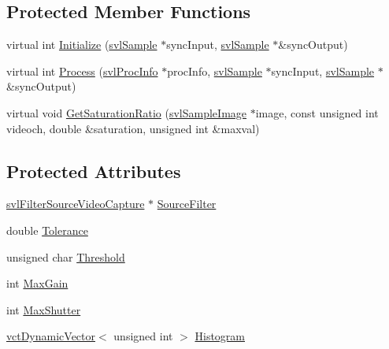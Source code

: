 \subsection*{Protected Member Functions}
\begin{DoxyCompactItemize}
\item 
virtual int \hyperlink{classsvl_filter_video_exposure_manager_a10dd305120d6db59cf59769ceb172299}{Initialize} (\hyperlink{classsvl_sample}{svl\-Sample} $\ast$sync\-Input, \hyperlink{classsvl_sample}{svl\-Sample} $\ast$\&sync\-Output)
\item 
virtual int \hyperlink{classsvl_filter_video_exposure_manager_a7f970fa286042e61110755b706a36217}{Process} (\hyperlink{structsvl_proc_info}{svl\-Proc\-Info} $\ast$proc\-Info, \hyperlink{classsvl_sample}{svl\-Sample} $\ast$sync\-Input, \hyperlink{classsvl_sample}{svl\-Sample} $\ast$\&sync\-Output)
\item 
virtual void \hyperlink{classsvl_filter_video_exposure_manager_a4b3ab1c8d4ee5916f08f30f5a873fb43}{Get\-Saturation\-Ratio} (\hyperlink{classsvl_sample_image}{svl\-Sample\-Image} $\ast$image, const unsigned int videoch, double \&saturation, unsigned int \&maxval)
\end{DoxyCompactItemize}
\subsection*{Protected Attributes}
\begin{DoxyCompactItemize}
\item 
\hyperlink{classsvl_filter_source_video_capture}{svl\-Filter\-Source\-Video\-Capture} $\ast$ \hyperlink{classsvl_filter_video_exposure_manager_a1465c2428b76152bd3397825a1d4163b}{Source\-Filter}
\item 
double \hyperlink{classsvl_filter_video_exposure_manager_ade971b6b43879957865e69fb76a045e3}{Tolerance}
\item 
unsigned char \hyperlink{classsvl_filter_video_exposure_manager_ab2fc8e4a7d94af1976849d160ac946ba}{Threshold}
\item 
int \hyperlink{classsvl_filter_video_exposure_manager_ad1b3117790f8bffebf55f8362eefda54}{Max\-Gain}
\item 
int \hyperlink{classsvl_filter_video_exposure_manager_a0c93ed7790f14669fdf52207f0a1105e}{Max\-Shutter}
\item 
\hyperlink{classvct_dynamic_vector}{vct\-Dynamic\-Vector}$<$ unsigned int $>$ \hyperlink{classsvl_filter_video_exposure_manager_a124bab248348d2ee81a6e1629366a146}{Histogram}
\end{DoxyCompactItemize}
